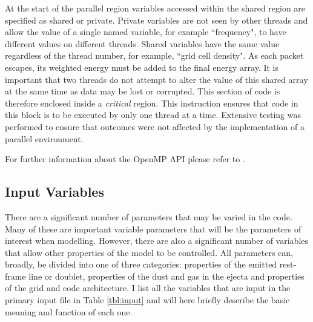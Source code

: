 	At the start of the parallel region variables accessed within the shared region are specified as shared or private.  Private variables are not seen by other threads and allow the value of a single named variable, for example ``frequency", to have different values on different threads.  Shared variables have the same value regardless of the thread number, for example, ``grid cell density".  As each packet escapes, its weighted energy must be added to the final energy array.  It is important that two threads do not attempt to alter the value of this shared array at the same time as data may be lost or corrupted. This section of code is therefore enclosed inside a \textit{critical} region.  This instruction ensures that code in this block is to be executed by only one thread at a time.  Extensive testing was performed to ensure that outcomes were not affected by the implementation of a parallel environment.
	
	For further information about the OpenMP API please refer to \citet{Chapman2007}.
	
	\subsection{Input Variables}
	
	There are a significant number of parameters that may be varied in the code.  Many of these are important variable parameters that will be the parameters of interest when modelling.  However, there are also a significant number of variables that allow other properties of the model to be controlled.  All parameters can, broadly,  be divided into one of three categories:  properties of the emitted rest-frame line or doublet, properties of the dust and gas in the ejecta and properties of the grid and code architecture.  I list all the variables that are input in the primary input file in Table \ref{tbl:input} and will here briefly describe the basic meaning and function of each one.
	
